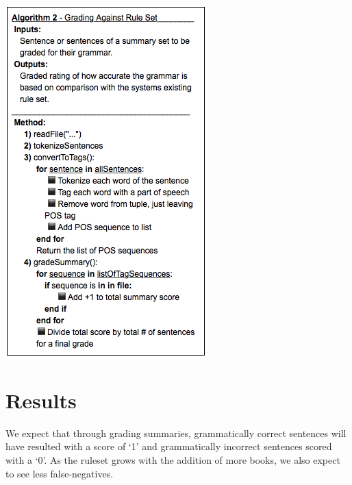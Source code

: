 \documentclass[11pt,a4paper]{article}
\newenvironment{Figure}
  {\par\medskip\noindent\minipage{\linewidth}}
  {\endminipage\par\medskip}
\begin{document}
\begin{multicols}{2}
\begin{Figure}  
   \centering
   \includegraphics[width=\linewidth]{GradeAlgorithm}
\end{Figure}   

\section{Results}
We expect that through grading summaries, grammatically correct sentences will have resulted with a score of `1' and grammatically incorrect sentences scored with a `0'. As the ruleset grows with the addition of more books, we also expect to see less false-negatives. 


\end{multicols}
\end{document}
